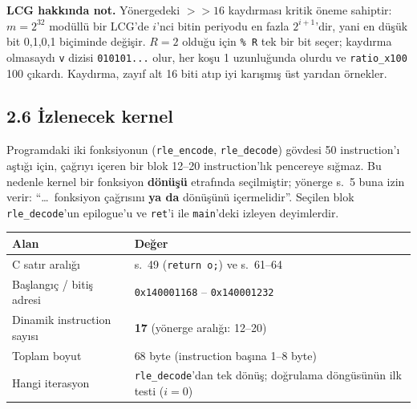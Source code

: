 \documentclass[11pt,a4paper]{article}
\newcommand{\tl}{\texttt}
\begin{document}
\textbf{LCG hakkında not.} Yönergedeki $>> 16$ kaydırması kritik öneme sahiptir: $m = 2^{32}$
modüllü bir LCG'de $i$'nci bitin periyodu en fazla $2^{i+1}$'dir, yani en düşük bit 0,1,0,1
biçiminde değişir. $R = 2$ olduğu için \tl{\% R} tek bir bit seçer; kaydırma olmasaydı
\tl{v} dizisi \tl{010101...} olur, her koşu 1 uzunluğunda olurdu ve \tl{ratio\_x100} 100 çıkardı.
Kaydırma, zayıf alt 16 biti atıp iyi karışmış üst yarıdan örnekler.

\subsection*{2.6 İzlenecek kernel}

Programdaki iki fonksiyonun (\tl{rle\_encode}, \tl{rle\_decode}) gövdesi 50 instruction'ı aştığı
için, çağrıyı içeren bir blok 12--20 instruction'lık pencereye sığmaz. Bu nedenle kernel bir
fonksiyon \textbf{dönüşü} etrafında seçilmiştir; yönerge s.~5 buna izin verir:
``\dots\ fonksiyon çağrısını \textbf{ya da} dönüşünü içermelidir''. Seçilen blok
\tl{rle\_decode}'un epilogue'u ve \tl{ret}'i ile \tl{main}'deki izleyen deyimlerdir.

\begin{longtable}{p{4.6cm}p{10.4cm}}
\toprule
\textbf{Alan} & \textbf{Değer}\\
\midrule
C satır aralığı & s.~49 (\tl{return o;}) ve s.~61--64\\
Başlangıç / bitiş adresi & \tl{0x140001168} -- \tl{0x140001232}\\
Dinamik instruction sayısı & \textbf{17} (yönerge aralığı: 12--20)\\
Toplam boyut & 68 byte (instruction başına 1--8 byte)\\
Hangi iterasyon & \tl{rle\_decode}'dan tek dönüş; doğrulama döngüsünün ilk testi ($i = 0$)\\
\bottomrule
\end{longtable}
\end{document}
